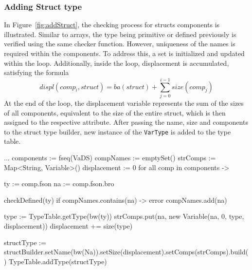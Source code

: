 \subsubsection{Adding Struct type}
In Figure~\ref{fig:addStruct}, the checking process for structs components is illustrated.
Similar to arrays, the type being primitive or defined previously is verified using the same checker function.
However, uniqueness of the names is required within the components.
To address this, a set is initialized and updated within the loop.
Additionally, inside the loop, displacement is accumulated, satisfying the formula
\[ displ(comp_i, struct) = ba(struct) + \sum_{j=0}^{i-1}size(comp_j)\]
At the end of the loop, the displacement variable represents the sum of the sizes of all components,
equivalent to the size of the entire struct, which is then assigned to the respective attribute.
After passing the name, size and components to the struct type builder, new instance of the \verb+VarType+
is added to the type table.
\newpage
\begin{codeblock}
    ...
    components := fseq(VaDS)
    compNames := emptySet()
    strComps := Map<String, Variable>()
    displacement := 0
    for all comp in components -> {
        ty := comp.fson
        na := comp.fson.bro

        checkDefined(ty)
        if compNames.contains(na) -> { error }
        compNames.add(na)

        type := TypeTable.getType(bw(ty))
        strComps.put(na, new Variable(na, 0, type, displacement))
        displacement += size(type)
    }
    structType := structBuilder.setName(bw(Na)).setSize(displacement).setComps(strComps).build()
    TypeTable.addType(structType)
\end{codeblock}

